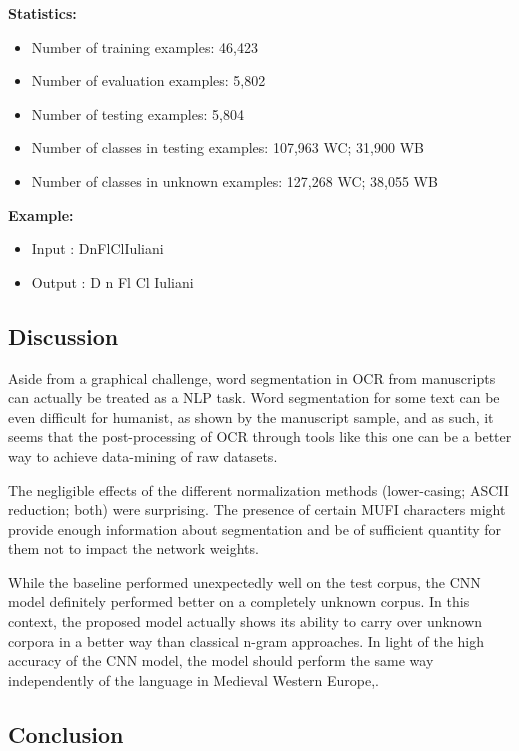 \documentclass{jdmdh}
\begin{document}
\textbf{Statistics:}

\begin{itemize}
\item Number of training examples: 46,423
\item Number of evaluation examples: 5,802
\item Number of testing examples: 5,804
\item Number of classes in testing examples: 107,963 WC; 31,900 WB
\item Number of classes in unknown examples: 127,268 WC; 38,055 WB
\end{itemize}

\textbf{Example:}

\begin{itemize}
    \item Input : DnFlClIuliani	
    \item Output : D n Fl Cl Iuliani
\end{itemize}

\subsection{Discussion}

Aside from a graphical challenge, word segmentation in OCR from manuscripts can actually be treated as a NLP task. Word segmentation for some text can be even difficult for humanist, as shown by the manuscript sample, and as such, it seems that the post-processing of OCR through tools like this one can be a better way to achieve data-mining of raw datasets.

The negligible effects of the different normalization methods (lower-casing; ASCII reduction; both) were surprising. The presence of certain MUFI characters might provide enough information about segmentation and be of sufficient quantity for them not to impact the network weights. 

While the baseline performed unexpectedly well on the test corpus, the CNN model definitely performed better on a completely unknown corpus. In this context, the proposed model actually shows its ability to carry over unknown corpora in a better way than classical n-gram approaches. In light of the high accuracy of the CNN model, the model should perform the same way independently of the language in Medieval Western Europe,.

\subsection{Conclusion}
\end{document}
